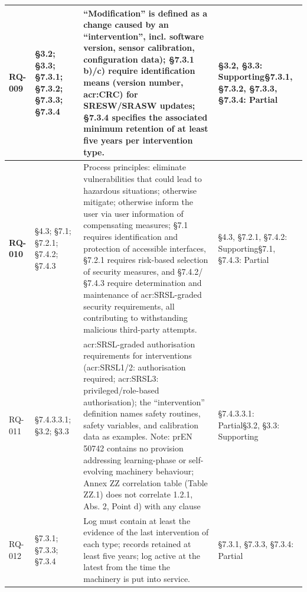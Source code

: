\begin{longtable}{|>{\bfseries}p{1cm}|p{2.5cm}|p{9cm}|>{\centering\arraybackslash}p{2cm}|}
	RQ-009 &
	\S3.2; \newline \S3.3;  \newline \S7.3.1;  \newline \S7.3.2;   \newline\S7.3.3; \newline \S7.3.4 &
	``Modification'' is defined as a change caused by an ``intervention'', incl. software version, sensor calibration, configuration data); \S7.3.1 b)/c) require identification means (version number, \gls{acr:CRC}) for SRESW/SRASW updates; \S7.3.4 specifies the associated minimum retention of at least five years per intervention type. &
	\S3.2, \S3.3: Supporting\newline\S7.3.1, \S7.3.2, \S7.3.3, \S7.3.4: Partial \\
	\hline
	
	RQ-010 &
	\S4.3;  \newline \S7.1;  \newline \S7.2.1;  \newline \S7.4.2;  \newline\S7.4.3 &
	Process principles: eliminate vulnerabilities that could lead to hazardous situations; otherwise mitigate; otherwise inform the user via user information of compensating measures; \S7.1 requires identification and protection of accessible interfaces, \S7.2.1 requires risk-based selection of security measures, and \S7.4.2/\S7.4.3 require determination and maintenance of \gls{acr:SRSL}-graded security requirements, all contributing to withstanding malicious third-party attempts. &
	\S4.3, \S7.2.1, \S7.4.2: Supporting\newline\S7.1, \S7.4.3: Partial \\
	\hline
	
	RQ-011 &
	\S7.4.3.3.1;  \newline \S3.2;  \newline \S3.3 &
	\gls{acr:SRSL}-graded authorisation requirements for interventions (\gls{acr:SRSL}1/2: authorisation required; \gls{acr:SRSL}3: privileged/role-based authorisation); the ``intervention'' definition names safety routines, safety variables, and calibration data as examples. Note: prEN 50742 contains no provision addressing learning-phase or self-evolving machinery behaviour; Annex ZZ correlation table (Table ZZ.1) does not correlate 1.2.1, Abs. 2, Point d) with any clause &
	\S7.4.3.3.1: Partial\newline\S3.2, \S3.3: Supporting \\
	\hline
	
	RQ-012 &
	\S7.3.1;  \newline \S7.3.3;  \newline \S7.3.4 &
	Log must contain at least the evidence of the last intervention of each type; records retained at least five years; log active at the latest from the time the machinery is put into service. &
	\S7.3.1, \S7.3.3, \S7.3.4: Partial \\
	\hline
	

\end{longtable}
